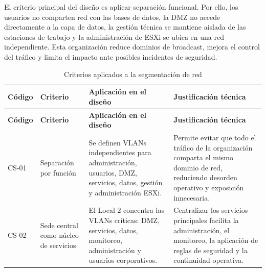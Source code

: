 \documentclass[11pt, a4paper, oneside]{report}
\begin{document}
El criterio principal del diseño es aplicar separación funcional. Por ello, los usuarios no comparten red con las bases de datos, la DMZ no accede directamente a la capa de datos, la gestión técnica se mantiene aislada de las estaciones de trabajo y la administración de ESXi se ubica en una red independiente. Esta organización reduce dominios de broadcast, mejora el control del tráfico y limita el impacto ante posibles incidentes de seguridad.

\renewcommand{\arraystretch}{1.3}
\footnotesize
{}

\begin{xltabular}{\textwidth}{@{}|N{1.5cm}|L{3.8cm}|X|X|@{}}
\caption{Criterios aplicados a la segmentación de red}
\label{tab:criterios_segmentacion_red} \\

\parbox[c][1.1cm][c]{\linewidth}{\centering\color{white}\bfseries\small Código} &
\parbox[c][1.1cm][c]{\linewidth}{\centering\color{white}\bfseries\small Criterio} &
\parbox[c][1.1cm][c]{\linewidth}{\centering\color{white}\bfseries\small Aplicación en el diseño} &
\parbox[c][1.1cm][c]{\linewidth}{\centering\color{white}\bfseries\small Justificación técnica} \\ \hline
\endfirsthead

\parbox[c][1.1cm][c]{\linewidth}{\centering\color{white}\bfseries\small Código} &
\parbox[c][1.1cm][c]{\linewidth}{\centering\color{white}\bfseries\small Criterio} &
\parbox[c][1.1cm][c]{\linewidth}{\centering\color{white}\bfseries\small Aplicación en el diseño} &
\parbox[c][1.1cm][c]{\linewidth}{\centering\color{white}\bfseries\small Justificación técnica} \\ \hline
\endhead

\hline
\endfoot

{\small CS-01} &
{\small Separación por función} &
{\small Se definen VLANs independientes para administración, usuarios, DMZ, servicios, datos, gestión y administración ESXi.} &
{\small Permite evitar que todo el tráfico de la organización comparta el mismo dominio de red, reduciendo desorden operativo y exposición innecesaria.} \\ \hline

{\small CS-02} &
{\small Sede central como núcleo de servicios} &
{\small El Local 2 concentra las VLANs críticas: DMZ, servicios, datos, monitoreo, administración y usuarios corporativos.} &
{\small Centralizar los servicios principales facilita la administración, el monitoreo, la aplicación de reglas de seguridad y la continuidad operativa.} \\ \hline


\end{xltabular}
\end{document}
